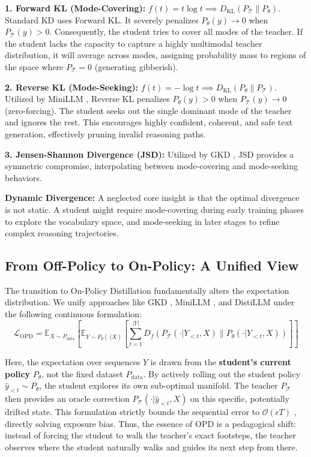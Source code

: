 \documentclass{article}
\newcommand{\E}{\mathbb{E}}
\newcommand{\ptheta}{P_\theta}
\newcommand{\pteacher}{P_{\mathcal{T}}}
\newcommand{\pdata}{P_{\mathrm{data}}}
\newcommand{\loss}{\mathcal{L}}
\begin{document}
\textbf{1. Forward KL (Mode-Covering):} $f(t) = t \log t \implies D_{\mathrm{KL}}(\pteacher \parallel \ptheta)$. \\
Standard KD uses Forward KL. It severely penalizes $\ptheta(y) \to 0$ when $\pteacher(y) > 0$. Consequently, the student tries to cover all modes of the teacher. If the student lacks the capacity to capture a highly multimodal teacher distribution, it will average across modes, assigning probability mass to regions of the space where $\pteacher = 0$ (generating gibberish).

\textbf{2. Reverse KL (Mode-Seeking):} $f(t) = -\log t \implies D_{\mathrm{KL}}(\ptheta \parallel \pteacher)$. \\
Utilized by MiniLLM \citep{2306.08543}, Reverse KL penalizes $\ptheta(y) > 0$ when $\pteacher(y) \to 0$ (zero-forcing). The student seeks out the single dominant mode of the teacher and ignores the rest. This encourages highly confident, coherent, and safe text generation, effectively pruning invalid reasoning paths.

\textbf{3. Jensen-Shannon Divergence (JSD):} Utilized by GKD \citep{2306.13649}, JSD provides a symmetric compromise, interpolating between mode-covering and mode-seeking behaviors.

\textbf{Dynamic Divergence:} A neglected core insight is that the optimal divergence is not static. A student might require mode-covering during early training phases to explore the vocabulary space, and mode-seeking in later stages to refine complex reasoning trajectories.

\subsection{From Off-Policy to On-Policy: A Unified View}
\label{sec:unified_view}

The transition to On-Policy Distillation fundamentally alters the expectation distribution. We unify approaches like GKD \citep{2306.13649}, MiniLLM \citep{2306.08543}, and DistiLLM \citep{2402.03898} under the following continuous formulation:
\begin{equation}
    \loss_{\mathrm{OPD}} = \E_{X \sim \pdata} \left[ \E_{Y \sim \ptheta(\cdot|X)} \left[ \sum_{t=1}^{|Y|} D_f \left( \pteacher(\cdot | Y_{<t}, X) \parallel \ptheta(\cdot | Y_{<t}, X) \right) \right] \right]
\end{equation}

Here, the expectation over sequences $Y$ is drawn from the \textbf{student's current policy} $\ptheta$, not the fixed dataset $\pdata$. 
By actively rolling out the student policy $\hat{y}_{<t} \sim \ptheta$, the student explores its own sub-optimal manifold. The teacher $\pteacher$ then provides an oracle correction $\pteacher(\cdot | \hat{y}_{<t}, X)$ on this specific, potentially drifted state. This formulation strictly bounds the sequential error to $\mathcal{O}(\epsilon T)$ \citep{ross2011reduction}, directly solving exposure bias. Thus, the essence of OPD is a pedagogical shift: instead of forcing the student to walk the teacher's exact footsteps, the teacher observes where the student naturally walks and guides its next step from there.
\end{document}

